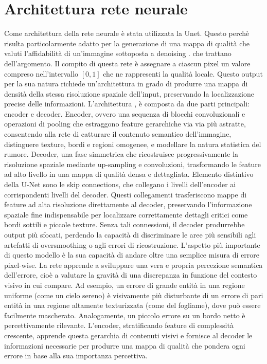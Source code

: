 \section{Architettura rete neurale}
Come architettura della rete neurale è stata utilizzata la Unet. Questo perchè risulta particolarmente adatto per la 
generazione di una mappa di qualità che valuti l'affidabilità di un'immagine sottoposta a denoising \cite{Vyver2025}. che trattano dell'argomento. Il compito di 
questa rete è assegnare a ciascun pixel un valore compreso nell'intervallo $[0,1]$ che ne rappresenti la 
qualità locale. Questo output per la sua natura richiede un'architettura in grado di produrre una mappa di densità 
della stessa risoluzione spaziale dell'input, preservando la localizzazione precise delle informazioni. 
L'architettura \cite{ronneberger2015unetconvolutionalnetworksbiomedical}, è composta da due parti principali: encoder e decoder. 
Encoder, ovvero una sequenza di blocchi convoluzionali e operazioni di pooling che estraggono feature 
gerarchiche via via più astratte, consentendo alla rete di catturare il contenuto semantico dell’immagine, 
distinguere texture, bordi e regioni omogenee, e modellare la natura statistica del rumore.
Decoder, una fase simmetrica che ricostruisce progressivamente la risoluzione spaziale 
mediante up-sampling e convoluzioni, trasformando le feature ad alto livello in una mappa di 
qualità densa e dettagliata.
Elemento distintivo della U-Net sono le skip connections, che collegano i livelli dell’encoder ai corrispondenti 
livelli del decoder. Questi collegamenti trasferiscono mappe di feature ad alta risoluzione direttamente al decoder, 
preservando l’informazione spaziale fine indispensabile per localizzare correttamente dettagli critici come bordi 
sottili e piccole texture. Senza tali connessioni, il decoder produrrebbe output più sfocati, perdendo la capacità 
di discriminare le aree più sensibili agli artefatti di oversmoothing o agli errori di ricostruzione.
L’aspetto più importante di questo modello è la sua capacità di andare oltre una semplice misura di errore pixel-wise. 
La rete apprende a sviluppare una vera e propria percezione semantica dell’errore, cioè a valutare la gravità di una 
discrepanza in funzione del contesto visivo in cui compare. Ad esempio, un errore di grande entità in una regione 
uniforme (come un cielo sereno) è visivamente più disturbante di un errore di pari entità in una regione altamente 
texturizzata (come del fogliame), dove può essere facilmente mascherato. Analogamente, un piccolo errore su un bordo 
netto è percettivamente rilevante. L’encoder, stratificando feature di complessità crescente, apprende questa gerarchia 
di contenuti visivi e fornisce al decoder le informazioni necessarie per produrre una mappa di qualità che pondera 
ogni errore in base alla sua importanza percettiva.

